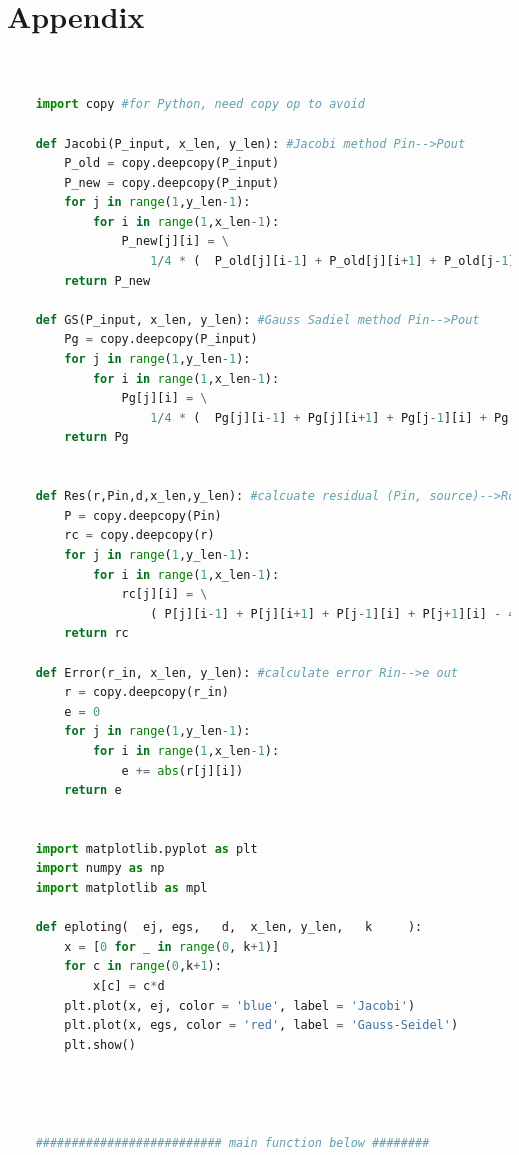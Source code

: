 \documentclass[12pt]{article}
\begin{document}
\section*{Appendix}
\begin{scriptsize}
\begin{lstlisting}[language=python,caption={(1)-The python Source code of Algorithm}]


    import copy #for Python, need copy op to avoid 

    def Jacobi(P_input, x_len, y_len): #Jacobi method Pin-->Pout
        P_old = copy.deepcopy(P_input)
        P_new = copy.deepcopy(P_input)
        for j in range(1,y_len-1):
            for i in range(1,x_len-1): 
                P_new[j][i] = \
                    1/4 * (  P_old[j][i-1] + P_old[j][i+1] + P_old[j-1][i] + P_old[j+1][i] )
        return P_new
    
    def GS(P_input, x_len, y_len): #Gauss Sadiel method Pin-->Pout
        Pg = copy.deepcopy(P_input)
        for j in range(1,y_len-1):
            for i in range(1,x_len-1): 
                Pg[j][i] = \
                    1/4 * (  Pg[j][i-1] + Pg[j][i+1] + Pg[j-1][i] + Pg[j+1][i] )
        return Pg
    
    
    def Res(r,Pin,d,x_len,y_len): #calcuate residual (Pin, source)-->Rout
        P = copy.deepcopy(Pin)
        rc = copy.deepcopy(r)
        for j in range(1,y_len-1):
            for i in range(1,x_len-1): 
                rc[j][i] = \
                    ( P[j][i-1] + P[j][i+1] + P[j-1][i] + P[j+1][i] - 4*P[j][i] )/(d**2)
        return rc
    
    def Error(r_in, x_len, y_len): #calculate error Rin-->e out
        r = copy.deepcopy(r_in)
        e = 0
        for j in range(1,y_len-1):
            for i in range(1,x_len-1): 
                e += abs(r[j][i])
        return e
    
    
    import matplotlib.pyplot as plt
    import numpy as np
    import matplotlib as mpl
    
    def eploting(  ej, egs,   d,  x_len, y_len,   k     ):
        x = [0 for _ in range(0, k+1)]
        for c in range(0,k+1):
            x[c] = c*d
        plt.plot(x, ej, color = 'blue', label = 'Jacobi')
        plt.plot(x, egs, color = 'red', label = 'Gauss-Seidel')
        plt.show()
    
    
    
    
    ########################## main function below ########
    

\end{lstlisting}
\end{scriptsize}
\end{document}
